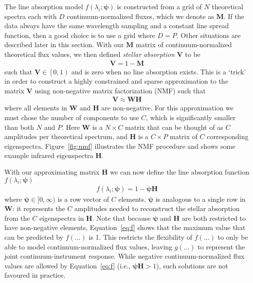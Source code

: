 \documentclass[modern]{aastex631}
\renewcommand{\vec}[1]{\mathbf{#1}}
\newcommand{\vecpsi}{\boldsymbol{\psi}}
\newcommand{\vecW}{\mathbf{W}}
\newcommand{\vecH}{\mathbf{H}}
\newcommand{\vecV}{\mathbf{V}}
\begin{document}
The line absorption model $f(\lambda_i;\vecpsi)$ is constructed from a grid of $N$ theoretical spectra each with $D$  continuum-normalized fluxes, which we denote as $\vec{M}$. If the data always have the same wavelength sampling and a constant line spread function, then a good choice is to use a grid where $D = P$. Other situations are described later in this section. With our $\vec{M}$ matrix of continuum-normalized theoretical flux values, we then defined \emph{stellar absorption} $\vecV$ to be
\begin{align}
    \vec{V} = 1 - \vec{M}
\end{align}
such that $\vec{V} \in \left[0, 1\right)$ and is zero when no line absorption exists. This is a `trick' in order to construct a highly constrained and sparse approximation to the matrix $\vecV$ using non-negative matrix factorization (NMF) such that 
\begin{align}
    \vec{V} \approx \vec{W}\vec{H}
\end{align}
where all elements in $\vec{W}$ and $\vec{H}$ are non-negative. 
For this approximation we must chose the number of components to use $C$, which is significantly smaller than both $N$ and $P$. Here $\vec{W}$ is a $N \times C$ matrix that can be thought of as $C$ amplitudes per theoretical spectrum, and $\vec{H}$ is a $C \times P$ matrix of $C$ corresponding eigenspectra. Figure~\ref{fig:nmf} illustrates the NMF procedure and shows some example infrared eigenspectra $\vec{H}$.


With our approximating matrix $\vec{H}$ we can now define the line absorption function $f(\lambda_i;\vecpsi)$ 
\begin{align}
    f(\lambda_i;\vecpsi) = 1 - \vecpsi\vecH \label{eq:f}
\end{align}
where $\vecpsi \in [0, \infty)$ is a row vector of $C$ elements. $\vecpsi$ is analogous to a single row in $\vecW$: it represents the $C$ amplitudes needed to reconstruct the stellar absorption from the $C$ eigenspectra in $\vecH$. Note that because $\vecpsi$ and $\vecH$ are both restricted to have non-negative elements, Equation~\ref{eq:f} shows that the maximum value that can be predicted by $f(...)$ is 1. This restricts the flexibility of $f(...)$ to only be able to model continuum-normalized flux values, leaving $g(...)$ to represent the joint continuum-instrument response. While negative continuum-normalized flux values are allowed by Equation~\ref{eq:f} (i.e., $\vecpsi\vecH > 1$), such solutions are not favoured in practice.
\end{document}
